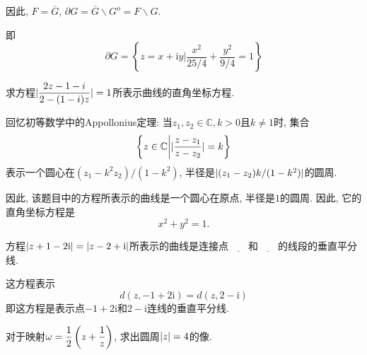 \begin{note}
	因此, $F = \overline{G}$, $\partial G = \overline{G}\backslash G^o = F\backslash G$.
	
	即\begin{equation*}
	\partial G = \left\{z = x+\mathrm{i}y \bigg| \frac{x^2}{25/4}+\frac{y^2}{9/4} =1 \right\}
	\end{equation*}
\end{note}

\begin{yyEx}
	求方程$\begin{lgathered}\abs{\frac{2z-1-i}{2-(1-i)z}} = 1\end{lgathered}$所表示曲线的直角坐标方程.
\end{yyEx}

\begin{yySolution}
	回忆初等数学中的Appollonius定理:
	当$z_1,z_2\in \mathbb{C},k>0$且$k\neq 1$时, 集合\begin{equation*}
		\left\{ z\in\mathbb{C}\bigg| \lvert\frac{z-z_1}{z-z_2}\rvert  = k \right\}
	\end{equation*}
	表示一个圆心在$(z_1-k^2z_2)/(1-k^2)$, 半径是$\lvert(z_1-z_2)k/(1-k^2)\rvert$的圆周.
	
	因此, 该题目中的方程所表示的曲线是一个圆心在原点, 半径是$1$的圆周. 因此, 它的直角坐标方程是\begin{equation*}
		x^2+y^2 = 1.
	\end{equation*}
\end{yySolution}

\begin{yyEx}
	方程$\lvert z+1-2\mathrm{i}\rvert = \lvert z-2+\mathrm{i}\rvert$所表示的曲线是连接点$\underline{\quad\quad}$和$\underline{\quad\quad}$的线段的垂直平分线.
\end{yyEx}

\begin{yySolution}
	这方程表示\begin{equation*}
		d(z,-1+2\mathrm{i}) = d(z,2-\mathrm{i})
	\end{equation*}
	即这方程是表示点$-1+2\mathrm{i}$和$2-\mathrm{i}$连线的垂直平分线.
\end{yySolution}

\begin{yyEx}
	对于映射$\begin{lgathered}\omega = \frac{1}{2}\left( z+\frac{1}{z} \right)\end{lgathered}$, 求出圆周$\lvert z\rvert = 4$的像.
\end{yyEx}

